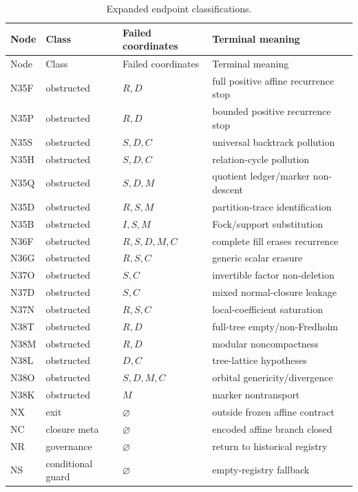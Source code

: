 \begin{longtable}{@{}L{1.6cm}L{2.3cm}L{3.0cm}L{7.0cm}@{}}
\caption{Expanded endpoint classifications.}\label{tab:endpoints}\\
\toprule
Node & Class & Failed coordinates & Terminal meaning \\
\midrule
\endfirsthead
\toprule
Node & Class & Failed coordinates & Terminal meaning \\
\midrule
\endhead
N35F & obstructed & $R,D$ & full positive affine recurrence stop \\
N35P & obstructed & $R,D$ & bounded positive recurrence stop \\
N35S & obstructed & $S,D,C$ & universal backtrack pollution \\
N35H & obstructed & $S,D,C$ & relation-cycle pollution \\
N35Q & obstructed & $S,D,M$ & quotient ledger/marker non-descent \\
N35D & obstructed & $R,S,M$ & partition-trace identification \\
N35B & obstructed & $I,S,M$ & Fock/support substitution \\
N36F & obstructed & $R,S,D,M,C$ & complete fill erases recurrence \\
N36G & obstructed & $R,S,C$ & generic scalar erasure \\
N37O & obstructed & $S,C$ & invertible factor non-deletion \\
N37D & obstructed & $S,C$ & mixed normal-closure leakage \\
N37N & obstructed & $R,S,C$ & local-coefficient saturation \\
N38T & obstructed & $R,D$ & full-tree empty/non-Fredholm \\
N38M & obstructed & $R,D$ & modular noncompactness \\
N38L & obstructed & $D,C$ & tree-lattice hypotheses \\
N38O & obstructed & $S,D,M,C$ & orbital genericity/divergence \\
N38K & obstructed & $M$ & marker nontransport \\
NX & exit & $\varnothing$ & outside frozen affine contract \\
NC & closure meta & $\varnothing$ & encoded affine branch closed \\
NR & governance & $\varnothing$ & return to historical registry \\
NS & conditional guard & $\varnothing$ & empty-registry fallback \\
\bottomrule
\end{longtable}

